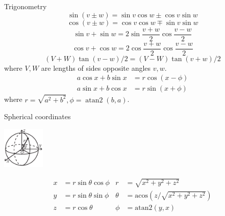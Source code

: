 \begin{misc}{Trigonometry}
	$$\sin(v\pm w) =\sin v\cos w\pm \cos v\sin w$$
	$$\cos(v\pm w) =\cos v\cos w\mp \sin v\sin w$$
	$$\sin v+\sin w =2\sin\dfrac{v+w}{2}\cos\dfrac{v-w}{2}$$
	$$\cos v+\cos w =2\cos\dfrac{v+w}{2}\cos\dfrac{v-w}{2}$$
	$$(V+W)\tan(v-w)/2{}=(V-W)\tan(v+w)/2$$
	where $V, W$ are lengths of sides opposite angles $v, w$.
	\begin{align*}
		a\cos x+b\sin x&=r\cos(x-\phi)\\
		a\sin x+b\cos x&=r\sin(x+\phi)
	\end{align*}
	where $r=\sqrt{a^2+b^2}, \phi=\operatorname{atan2}(b,a)$.
\end{misc}

\begin{misc}{Spherical coordinates}
	\vspace{-0.5cm}
	\begin{center}
		\includegraphics[width=20mm]{sphericalCoordinates}
	\end{center}
	\vspace{-0.3cm}
	\begin{align*}
		x &= r\sin\theta\cos\phi & r &= \sqrt{x^2+y^2+z^2}\\
		y &= r\sin\theta\sin\phi & \theta &= \textrm{acos}(z/\sqrt{x^2+y^2+z^2})\\
		z &= r\cos\theta & \phi &= \textrm{atan2}(y,x)
	\end{align*}
\end{misc}

